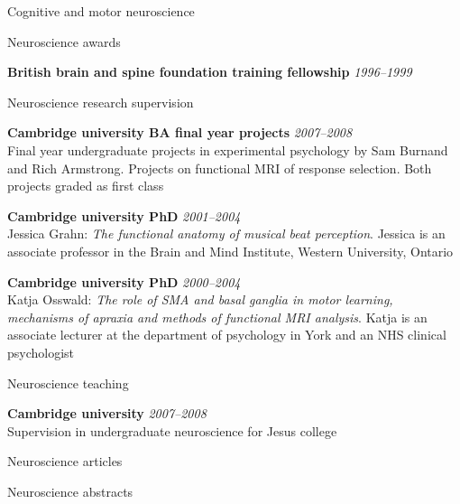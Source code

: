 \documentclass{cv}
\newcommand{\PlaceDateNote}[3]{{\bf #1} \hfill {\em #2} \\#3}
\begin{document}
\begin{cvSection}{Cognitive and motor neuroscience}

\begin{cvSubSection}{Neuroscience awards}

{\bf British brain and spine foundation training fellowship} \hfill {\em
1996--1999}

\end{cvSubSection}

\begin{cvSubSection}{Neuroscience research supervision}

\PlaceDateNote{Cambridge university BA final year projects}{2007--2008}
{Final year undergraduate projects in experimental psychology by Sam Burnand
and Rich Armstrong.  Projects on functional MRI of response selection.  Both
projects graded as first class}

\PlaceDateNote{Cambridge university PhD}{2001--2004}
{Jessica Grahn: {\em The functional anatomy of musical beat perception}.
Jessica is an associate professor in the Brain and Mind Institute, Western
University, Ontario}

\PlaceDateNote{Cambridge university PhD}{2000--2004}
{Katja Osswald: {\em The role of SMA and basal ganglia in motor learning,
mechanisms of apraxia and methods of functional MRI analysis}. Katja is an
associate lecturer at the department of psychology in York and an NHS clinical
psychologist}

\end{cvSubSection}

\begin{cvSubSection}{Neuroscience teaching}

\PlaceDateNote{Cambridge university}{2007--2008}{
Supervision in undergraduate neuroscience for Jesus college}

\end{cvSubSection}

\begin{cvSubSection}{Neuroscience articles}

\printbibliography[heading=none,
    keyword=movethink,
    keyword=article,
notkeyword=omit]

\end{cvSubSection}

\begin{cvSubSection}{Neuroscience abstracts}

\printbibliography[heading=none,
    keyword=movethink,
    keyword=abstract,
notkeyword=omit]

\end{cvSubSection}

\end{cvSection}
\end{document}
